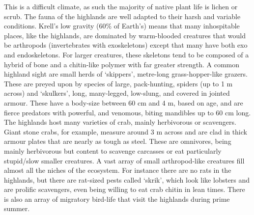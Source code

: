 \documentclass[a4paper,11pt,oneside]{book}
\begin{document}
This is a difficult climate, as such the majority of native plant life is lichen or scrub. The fauna of the highlands are well adapted to their harsh and variable conditions. Krell's low gravity (60\% of Earth's) means that many inhospitable places, like the highlands, are dominated by warm-blooded creatures that would be arthropods (invertebrates with exoskeletons) except that many have both exo and endoskeletons. For larger creatures, these skeletons tend to be composed of a hybrid of bone and a chitin-like polymer with far greater strength. A common highland sight are small herds of `skippers', metre-long grass-hopper-like grazers. These are preyed upon by species of large, pack-hunting, spiders (up to 1 m across) and `skulkers', long, many-legged, low-slung, and covered in jointed armour. These have a body-size between 60 cm and 4 m, based on age, and are fierce predators with powerful, and venomous, biting mandibles up to 60 cm long. The highlands host many varieties of crab, mainly herbivorous or scavengers. Giant stone crabs, for example, measure around 3 m across and are clad in thick armour plates that are nearly as tough as steel. These are omnivores, being mainly herbivorous but content to scavenge carcasses or eat particularly stupid/slow smaller creatures. A vast array of small arthropod-like creatures fill almost all the niches of the ecosystem. For instance there are no rats in the highlands, but there are rat-sized pests called `skrik', which look like lobsters and are prolific scavengers, even being willing to eat crab chitin in lean times. There is also an array of migratory bird-life that visit the highlands during prime summer. 
\end{document}
